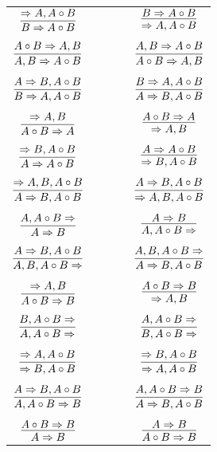 \documentclass[11pt]{article}
\begin{document}
\begin{center}
\begin{tabular}{ccc}
$\infer{B\Rightarrow A\circ B}{\Rightarrow A, A\circ B}$ & \ \ \ \ & $\infer{\Rightarrow A, A\circ B}{B\Rightarrow A\circ B}$ \\
&& \\
$\infer{A, B\Rightarrow A\circ B}{A\circ B\Rightarrow A, B}$ && $\infer{A\circ B\Rightarrow A, B}{A, B\Rightarrow A\circ B}$ \\
&& \\
$\infer{B\Rightarrow A, A\circ B}{A\Rightarrow B, A\circ B}$ && $\infer{A\Rightarrow B, A\circ B}{B\Rightarrow A, A\circ B}$ \\
&& \\
$\infer{A\circ B\Rightarrow A}{\Rightarrow A, B}$ && $\infer{\Rightarrow A, B}{A\circ B\Rightarrow A}$ \\
&& \\
$\infer{A\Rightarrow A\circ B}{\Rightarrow B, A\circ B}$ && $\infer{\Rightarrow B, A\circ B}{A\Rightarrow A\circ B}$ \\
&& \\
$\infer{A\Rightarrow B, A\circ B}{\Rightarrow A, B, A\circ B}$ && $\infer{\Rightarrow A, B, A\circ B}{A\Rightarrow B, A\circ B}$ \\
&& \\
$\infer{A\Rightarrow B}{A, A\circ B\Rightarrow }$ && $\infer{A, A\circ B\Rightarrow }{A\Rightarrow B}$ \\
&& \\
$\infer{A, B, A\circ B\Rightarrow }{A\Rightarrow B, A\circ B}$ && $\infer{A\Rightarrow B, A\circ B}{A, B, A\circ B\Rightarrow }$ \\
&& \\
$\infer{A\circ B\Rightarrow B}{\Rightarrow A, B}$ && $\infer{\Rightarrow A, B}{A\circ B\Rightarrow B}$ \\
&& \\
$\infer{A, A\circ B\Rightarrow }{B, A\circ B\Rightarrow }$ && $\infer{B, A\circ B\Rightarrow }{A, A\circ B\Rightarrow }$ \\
&&\\
$\infer{\Rightarrow B, A\circ B}{\Rightarrow A, A\circ B}$ && $\infer{\Rightarrow A, A\circ B}{\Rightarrow B, A\circ B}$ \\
&& \\
$\infer{A, A\circ B\Rightarrow B}{A\Rightarrow B, A\circ B}$ && $\infer{A\Rightarrow B, A\circ B}{A, A\circ B\Rightarrow B}$ \\
&& \\
$\infer{A\Rightarrow B}{A\circ B\Rightarrow B}$ && $\infer{A\circ B\Rightarrow B}{A\Rightarrow B}$ \\
\end{tabular}


\end{center}
\end{document}
